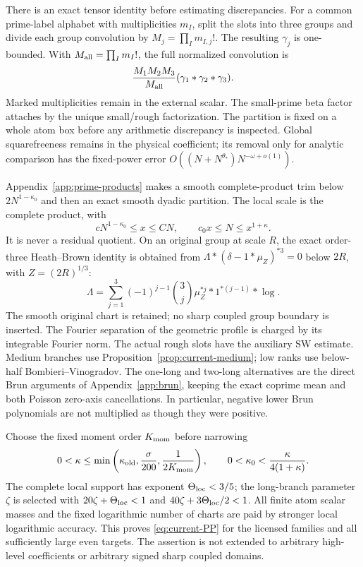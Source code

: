 There is an exact tensor identity before estimating discrepancies.
For a common prime-label alphabet with multiplicities $m_I$, split
the slots into three groups and divide each group convolution by
$M_j=\prod_I m_{I,j}!$.  The resulting $\gamma_j$ is one-bounded.
With $M_{\rm all}=\prod_I m_I!$, the full normalized convolution is
\[
 \frac{M_1M_2M_3}{M_{\rm all}}
                       (\gamma_1*\gamma_2*\gamma_3).
\]
Marked multiplicities remain in the external scalar.  The small-prime
beta factor attaches by the unique small/rough factorization.  The
partition is fixed on a whole atom box before any arithmetic
discrepancy is inspected.  Global squarefreeness remains in the
physical coefficient; its removal only for analytic comparison has
the fixed-power error
$O((N+N^{\theta_*})N^{-\omega+o(1)})$.

Appendix~\ref{app:prime-products} makes a smooth complete-product trim
below $2N^{1-\kappa_0}$ and then an exact smooth dyadic partition.
The local scale is the complete product, with
\[
 cN^{1-\kappa_0}\le x\le CN,\qquad
 c_0x\le N\le x^{1+\kappa}.
\]
It is never a residual quotient.  On an original group at scale $R$,
the exact order-three Heath--Brown identity is obtained from
$\Lambda*(\delta-1*\mu_Z)^{*3}=0$ below $2R$, with
$Z=(2R)^{1/3}$:
\begin{equation}
 \Lambda=\sum_{j=1}^3(-1)^{j-1}\binom3j
                 \mu_Z^{*j}*1^{*(j-1)}*\log.
 \label{eq:current-HB}
\end{equation}
The smooth original chart is retained; no sharp coupled group boundary
is inserted.  The Fourier separation of the geometric profile is
charged by its integrable Fourier norm.  The actual rough slots have
the auxiliary SW estimate.  Medium branches use
Proposition~\ref{prop:current-medium}; low ranks use below-half
Bombieri--Vinogradov.  The one-long and two-long alternatives are the
direct Brun arguments of Appendix~\ref{app:brun}, keeping the exact
coprime mean and both Poisson zero-axis cancellations.  In particular,
negative lower Brun polynomials are not multiplied as though they
were positive.

Choose the fixed moment order $K_{\rm mom}$ before narrowing
\[
 0<\kappa\le\min\left(\kappa_{\rm old},\frac{\sigma}{200},
                           \frac1{2K_{\rm mom}}\right),\qquad
 0<\kappa_0<\frac{\kappa}{4(1+\kappa)}.
\]
The complete local support has exponent $\Theta_{\rm loc}<3/5$;
the long-branch parameter $\zeta$ is selected with
$20\zeta+\Theta_{\rm loc}<1$ and
$40\zeta+3\Theta_{\rm loc}/2<1$.  All finite atom scalar masses and
the fixed logarithmic number of charts are paid by stronger local
logarithmic accuracy.  This proves \eqref{eq:current-PP} for the
licensed families and all sufficiently large even targets.  The
assertion is not extended to arbitrary high-level coefficients or
arbitrary signed sharp coupled domains.

